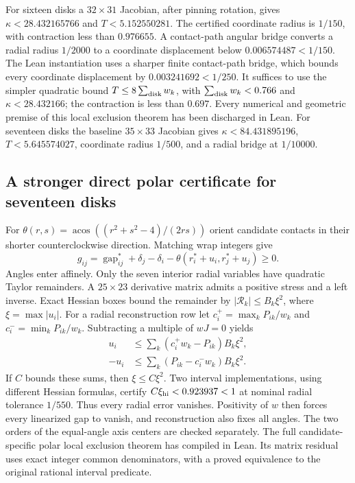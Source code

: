 \documentclass[11pt]{amsart}
\theoremstyle{definition}
\theoremstyle{remark}
\DeclareMathOperator{\acos}{acos}
\begin{document}
For sixteen disks a $32\times31$ Jacobian, after pinning rotation, gives
$\kappa<28.432165766$ and $T<5.152550281$. The certified coordinate
radius is $1/150$, with contraction less than $0.976655$.
A contact-path angular bridge converts a radial radius $1/2000$ to a
coordinate displacement below $0.006574487<1/150$.
The Lean instantiation uses a sharper finite contact-path bridge, which
bounds every coordinate displacement by $0.003241692<1/250$. It suffices
to use the simpler quadratic bound $T\le8\sum_{\rm disk}w_k$, with
$\sum_{\rm disk}w_k<0.766$ and $\kappa<28.432166$; the contraction
is less than $0.697$. Every numerical and geometric premise of this
local exclusion theorem has been discharged in Lean.
For seventeen disks the baseline $35\times33$ Jacobian gives
$\kappa<84.431895196$, $T<5.645574027$, coordinate radius $1/500$,
and a radial bridge at $1/10000$.

\subsection{A stronger direct polar certificate for seventeen disks}
For $\theta(r,s)=\acos((r^2+s^2-4)/(2rs))$ orient candidate contacts in
their shorter counterclockwise direction. Matching wrap integers give
\[
g_{ij}=\operatorname{gap}_{ij}^*+\delta_j-\delta_i
              -\theta(r_i^*+u_i,r_j^*+u_j)\ge0.
\]
Angles enter affinely. Only the seven interior radial variables have
quadratic Taylor remainders. A $25\times23$ derivative matrix admits a
positive stress and a left inverse. Exact Hessian boxes bound the remainder
by $|\mathcal R_k|\le B_k\xi^2$, where $\xi=\max|u_i|$.
For a radial reconstruction row let
$c_i^+=\max_k P_{ik}/w_k$ and $c_i^-=\min_k P_{ik}/w_k$.
Subtracting a multiple of $wJ=0$ yields
\begin{align*}
u_i&\le\sum_k(c_i^+w_k-P_{ik})B_k\xi^2,\\
-u_i&\le\sum_k(P_{ik}-c_i^-w_k)B_k\xi^2.
\end{align*}
If $C$ bounds these sums, then $\xi\le C\xi^2$.
Two interval implementations, using different Hessian formulas, certify
$C\xi_{\rm hi}<0.923937<1$ at nominal radial tolerance $1/550$.
Thus every radial error vanishes. Positivity of $w$ then forces every
linearized gap to vanish, and reconstruction also fixes all angles.
The two orders of the equal-angle axis centers are checked separately.
The full candidate-specific polar local exclusion theorem has compiled in
Lean. Its matrix residual uses exact integer common denominators, with a
proved equivalence to the original rational interval predicate.
\end{document}
